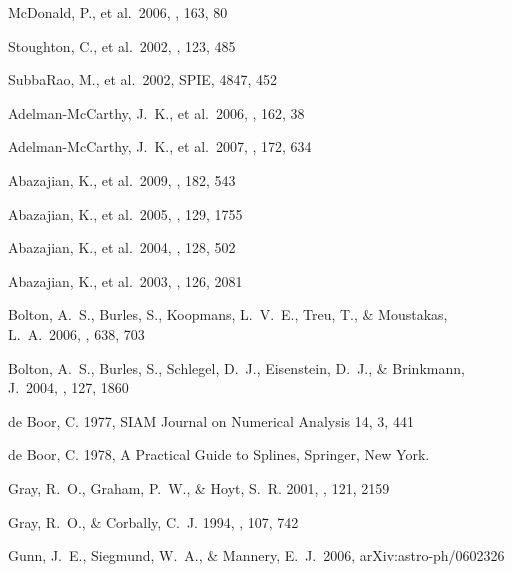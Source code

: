 \documentclass[12pt,preprint]{aastex}
\begin{document}
\begin{thebibliography}{DUM}

 McDonald, P., et al.\ 
2006, \apjs, 163, 80 

 Stoughton, C., et 
al.\ 2002, \aj, 123, 485 

 SubbaRao, M., et al.\ 2002, SPIE, 4847, 452

Adelman-McCarthy, J.~K., et al.\ 2006, \apjs, 162, 38 

Adelman-McCarthy, J.~K., et al.\ 2007, \apjs, 172, 634 

 Abazajian, K., et 
al.\ 2009, \apjs, 182, 543

 Abazajian, K., et 
al.\ 2005, \aj, 129, 1755 

 Abazajian, K., et 
al.\ 2004, \aj, 128, 502 

 Abazajian, K., et 
al.\ 2003, \aj, 126, 2081 

 Bolton, A.~S., Burles, 
S., Koopmans, L.~V.~E., Treu, T., \& Moustakas, L.~A.\ 2006, \apj, 638, 703 

 Bolton, A.~S., Burles, 
S., Schlegel, D.~J., Eisenstein, D.~J., \& Brinkmann, J.\ 2004, \aj, 127, 
1860 

de Boor, C. 1977,  SIAM Journal on Numerical Analysis 14, 3, 441

de Boor, C. 1978, A Practical Guide to Splines, Springer, New York.

\bibitem[Gray et al. 2001]{gray01}
Gray, R.\ O., Graham, P.\ W., \& Hoyt, S.\ R. 2001, \aj, 121, 2159

Gray, R.\ O., \& Corbally, C.\ J. 1994, \aj, 107, 742

 Gunn, J.~E., Siegmund, 
W.~A., \& Mannery, E.~J.\ 2006, arXiv:astro-ph/0602326 


\end{thebibliography}
\end{document}
